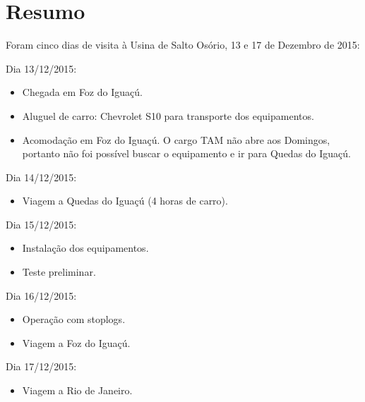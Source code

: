 \section{Resumo}
Foram cinco dias de visita à Usina de Salto Osório, 13 e 17 de Dezembro de 2015:

Dia 13/12/2015:
\begin{itemize}
  \item Chegada em Foz do Iguaçú.
  \item Aluguel de carro: Chevrolet S10 para transporte dos equipamentos.
  \item Acomodação em Foz do Iguaçú. O cargo TAM não abre aos Domingos, portanto
  não foi possível buscar o equipamento e ir para Quedas do Iguaçú.
\end{itemize}

Dia 14/12/2015:
\begin{itemize}
  \item Viagem a Quedas do Iguaçú (4 horas de carro).
\end{itemize}

Dia 15/12/2015:
\begin{itemize}
  \item Instalação dos equipamentos.
  \item Teste preliminar.
\end{itemize}

Dia 16/12/2015:
\begin{itemize}
  \item Operação com stoplogs.
  \item Viagem a Foz do Iguaçú.
\end{itemize}

Dia 17/12/2015:
\begin{itemize}
  \item Viagem a Rio de Janeiro.
\end{itemize}